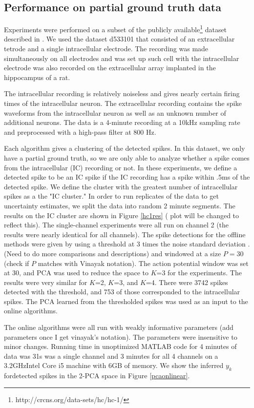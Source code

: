 \subsection{Performance on partial ground truth data}
Experiments were performed on a subset of the publicly available\footnote{http://crcns.org/data-sets/hc/hc-1/} dataset described in \cite{Henze2000}.  We used the dataset d533101 that consisted of an extracellular tetrode and a single intracellular electrode.  The recording was made simultaneously on all electrodes and was set up such cell with the intracellular electrode was also recorded on the extracellular array implanted in the hippocampus of a rat.

The intracellular recording is relatively noiseless and gives nearly certain firing times of the intracellular neuron.  The extracellular recording contains the spike waveforms from the intracellular neuron as well as an unknown number of additional neurons.  The data is a 4-minute recording at a 10kHz sampling rate and preprocessed with a high-pass filter at 800 Hz.

Each algorithm gives a clustering of the detected spikes.  In this dataset, we only have a partial ground truth, so we are only able to analyze whether a spike comes from the intracellular (IC) recording or not.  In these experiments, we define a detected spike to be an IC spike if the IC recording has a spike within .5ms of the detected spike.  We define the cluster with the greatest number of intracellular spikes as a the "IC cluster."  In order to run replicates of the data to get uncertainty estimates, we split the data into random 2 minute segments.  The results on the IC cluster are shown in Figure \ref{hc1res} ({\color{red} plot will be changed to reflect this}).  The single-channel experiments were all run on channel 2 (the results were nearly identical for all channels).  The spike detections for the offline methods were given by using a threshold at 3 times the noise standard deviation \cite{Lewicki}. (Need to do more comparisons and descriptions) and windowed at a size $P=30$ (check if $P$ matches with Vinayak notation).  The action potential window was set at 30, and PCA was used to reduce the space to $K$=3 for the experiments.  The results were very similar for $K$=2, $K$=3, and $K$=4.   There were 3742 spikes detected with the threshold, and 753 of those corresponded to the intracellular spikes.  The PCA learned from the thresholded spikes was used as an input to the online algorithms.

The online algorithms were all run with weakly informative parameters (add parameters once I get vinayak's notation). The parameters were insensitive to minor changes.  Running time in unoptimized MATLAB code for 4 minutes of data was 31s was a single channel and 3 minutes for all 4 channels on a 3.2GHzIntel Core i5 machine with 6GB of memory.  We show the inferred $y_k$ fordetected spikes in the 2-PCA space in Figure \ref{pcaonlinear}.

